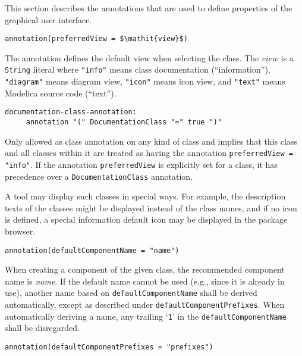This section describes the annotations that are used to define properties of the graphical user interface.

\begin{lstlisting}[language=modelica]
annotation(preferredView = $\mathit{view}$)
\end{lstlisting}

The  annotation defines the default view when selecting the class.
The $\mathit{view}$ is a \lstinline!String! literal where \lstinline!"info"! means class documentation (``information''), \lstinline!"diagram"! means diagram view, \lstinline!"icon"! means icon view, and \lstinline!"text"! means Modelica source code (``text'').

\begin{lstlisting}[language=grammar]
  documentation-class-annotation:
     annotation "(" DocumentationClass "=" true ")"
\end{lstlisting}%

Only allowed as class annotation on any kind of class and implies that this class and all classes within it are treated as having the annotation \lstinline!preferredView = "info"!.
If the annotation \lstinline!preferredView! is explicitly set for a class, it has precedence over a \lstinline!DocumentationClass! annotation.

\begin{nonnormative}
A tool may display such classes in special ways.
For example, the description texts of the classes might be displayed instead of the class names, and if no icon is defined, a special information default icon may be displayed in the package browser.
\end{nonnormative}

\begin{lstlisting}[language=modelica]
 annotation(defaultComponentName = "name")
\end{lstlisting}%

When creating a component of the given class, the recommended component name is \emph{name}.
If the default name cannot be used (e.g., since it is already in use), another name based on \lstinline!defaultComponentName! shall be derived automatically, except as described under \lstinline!defaultComponentPrefixes!.
When automatically deriving a name, any trailing `\lstinline!1!' in the \lstinline!defaultComponentName! shall be disregarded.

\begin{lstlisting}[language=modelica]
annotation(defaultComponentPrefixes = "prefixes")
\end{lstlisting}%

